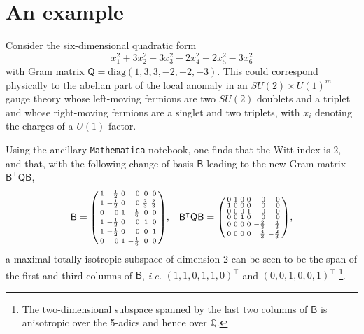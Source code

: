 \documentclass[11pt,a4paper]{article}
\begin{document}
\section{An example}\label{section:ex}
Consider the six-dimensional quadratic form
$$x_1^2+3x_2^2+3x_3^2-2x_4^2-2x_5^2-3x_6^2$$
with Gram matrix $\mathsf{Q}=\mathrm{diag}(1,3,3,-2,-2,-3)$.
This could correspond physically to the abelian part of the local anomaly in an $SU(2) \times U(1)^m$ gauge theory whose left-moving fermions are two $SU(2)$ doublets and a triplet and whose right-moving fermions are a singlet and two triplets, with $x_i$ denoting the charges of a $U(1)$ factor.

Using the ancillary \texttt{Mathematica} notebook, one finds that the Witt index is 2, and that, with the following change of basis $\mathsf{B}$ leading to the new Gram matrix $\mathsf{B}^\intercal\mathsf{QB}$,
\begin{align*}
	\mathsf{B}=
	\begin{psmallmatrix*}[r]
		1 & \frac{1}{2} & 0 & 0 & 0 & 0 \\
		1 & -\frac{1}{2} & 0 & 0 & \frac{2}{3} & \frac{2}{3} \\
		0 & 0 & 1 & \frac{1}{6} & 0 & 0 \\
		1 & -\frac{1}{2} & 0 & 0 & 1 & 0 \\
		1 & -\frac{1}{2} & 0 & 0 & 0 & 1 \\
		0 & 0 & 1 & -\frac{1}{6} & 0 & 0 \\
	\end{psmallmatrix*},&&
	\mathsf{B^\intercal QB}=\begin{psmallmatrix*}[r]
		0 & 1 & 0 & 0 & 0 & 0 \\
		1 & 0 & 0 & 0 & 0 & 0 \\
		0 & 0 & 0 & 1 & 0 & 0 \\
		0 & 0 & 1 & 0 & 0 & 0 \\
		0 & 0 & 0 & 0 & -\frac{2}{3} & \frac{4}{3} \\
		0 & 0 & 0 & 0 & \frac{4}{3} & -\frac{2}{3} \\
	\end{psmallmatrix*},
\end{align*}
a maximal totally isotropic subspace of dimension 2 can be seen to be the span of the first and third columns of $\mathsf{B}$, {\em{i.e.}} $(1,1,0,1,1,0)^\intercal$ and $(0,0,1,0,0,1)^\intercal$ \footnote{The two-dimensional subspace spanned by the last two columns of $\mathsf{B}$ is anisotropic over the 5-adics and hence over $\mathbb{Q}$.}.
 
\end{document}
